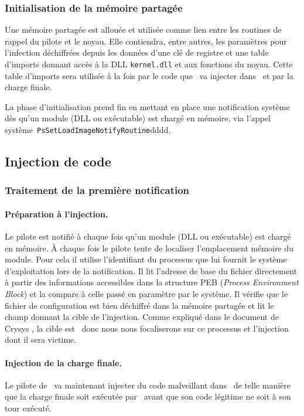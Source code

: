 \subsubsection{Initialisation de la mémoire partagée}
Une mémoire partagée est allouée et utilisée comme lien entre les routines de rappel du pilote et le noyau.
Elle contiendra, entre autres, les paramètres pour l'infection déchiffrées depuis les données d'une clé de registre et une table d'imports donnant accès à la DLL \texttt{kernel.dll} et aux fonctions du noyau.
Cette table d'imports sera utilisée à la fois par le code que \duqu\ va injecter dans \services\ et par la charge finale.

La phase d'initialisation prend fin en mettant en place une notification système dès qu'un module (DLL ou exécutable) est chargé en mémoire, via l'appel système~\texttt{PsSetLoadImageNotifyRoutine}dddd.

\subsection{Injection de code}
\subsubsection{Traitement de la première notification}
\paragraph{Préparation à l'injection.}
Le pilote est notifié à chaque fois qu'un module (DLL ou exécutable) est chargé en mémoire.
À chaque fois le pilote tente de localiser l'emplacement mémoire du module.
Pour cela il utilise l'identifiant du processus que lui fournit le système d'exploitation lors de la notification.
Il lit l'adresse de base du fichier directement à partir des informations accessibles dans la structure PEB (\emph{Process Environment Block}) et la compare à celle passé en paramètre par le système.
Il vérifie que le fichier de configuration est bien déchiffré dans la mémoire partagée et lit le champ donnant la cible de l'injection.
Comme expliqué dans le document de Crysys \cite{CrysysDuquStuxnet}, la cible est \services\ donc nous nous focaliserons sur ce processus et l'injection dont il sera victime.

\paragraph{Injection de la charge finale.}
Le pilote de \duqu\ va maintenant injecter du code malveillant dans \services\ de telle manière que la charge finale soit exécutée par \services\ avant que son code légitime ne soit à son tour exécuté.

